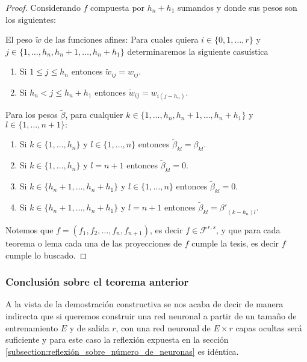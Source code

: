 \begin{proof}
    Considerando $f$ compuesta por $h_n + h_1$ sumandos y donde sus pesos son los siguientes:

    El peso $\tilde{w}$ de las funciones afines: 
    Para cuales quiera 
    $i \in \{0, 1, \ldots  , r \}$  y  
    $j \in \{1, \ldots , h_n, h_{n} + 1, \ldots, h_n + h_1\}$  determinaremos la siguiente casuística
    \begin{enumerate}
        \item Si $1 \leq j \leq h_n$ entonces $\tilde{w}_{i j} = w_{i j}.$
        \item Si $h_n < j \leq h_n + h_1$ entonces $\tilde{w}_{i j} = w_{i (j-h_n)}.$
    \end{enumerate}

    Para los pesos $\tilde{\beta}$, para cualquier
    $k \in \{1, \ldots , h_n, h_{n} + 1, \ldots, h_n + h_1\}$ y  
    $l \in \{1, \ldots ,  n+1 \} :$ 
    \begin{enumerate}
        \item Si $k \in \{1, \ldots ,  h_n \}$ y $l \in \{1, \ldots , n\}$ 
        entonces $\tilde{\beta}_{k l} = \beta_{k l}.$
        \item Si $k \in \{1, \ldots , h_n \}$ y $l=n+1$ 
        entonces $\tilde{\beta}_{k l} = 0.$
        \item Si $k \in \{h_{n} + 1, \ldots, h_n + h_1 \}$ 
        y $l \in \{1, \ldots , n\}$ 
        entonces $\tilde{\beta}_{k l} = 0.$
        \item Si $k \in \{h_{n} + 1, \ldots, h_n + h_1 \}$ 
        y $l=n+1$ 
        entonces 
        $\tilde{\beta}_{k l} = {\beta '}_{(k- h_n) l}.$
    \end{enumerate}

    Notemos que $f=(f_1, f_2, \ldots, f_n, f_{n+1})$, es decir $f \in \mathcal{F}^{r,s}$, y que para cada teorema o lema
    cada una de las proyecciones de $f$ cumple la tesis, es decir $f$ cumple lo buscado. 
\end{proof}

\subsubsection*{ Conclusión sobre el teorema anterior}  
A la vista de la demostración constructiva se nos acaba de decir de manera indirecta que si queremos construir una red neuronal 
a partir de un tamaño de entrenamiento $E$ y de salida $r$, 
con una red neuronal de $E \times r$ capas ocultas será suficiente y para este caso la reflexión expuesta en la sección \ref{subsection:reflexión_sobre_número_de_neuronas} es idéntica. 




